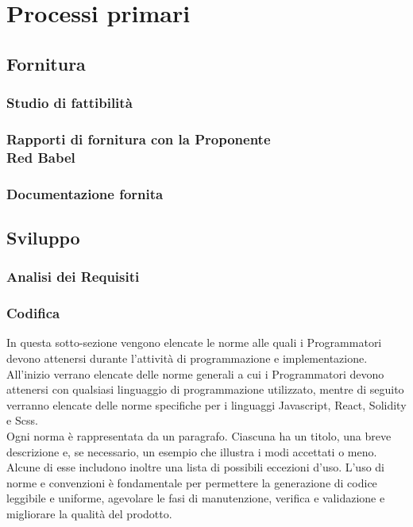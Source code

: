 \documentclass[NormeDiProgetto.tex]{subfiles}
\begin{document}
\chapter{Processi primari}

\section{Fornitura}
\subsection{Studio di fattibilità}
\subsection[Rapporti di fornitura con la Proponente Red Babel]{Rapporti di fornitura con la Proponente \\ Red Babel}
\subsection{Documentazione fornita}

\section{Sviluppo}
\subsection{Analisi dei Requisiti}
\subsection{Codifica}
In questa sotto-sezione vengono elencate le norme alle quali i Programmatori devono attenersi durante l'attività di programmazione e implementazione.\\
All'inizio verrano elencate delle norme generali a cui i Programmatori devono attenersi con qualsiasi linguaggio di programmazione utilizzato, mentre di seguito verranno elencate delle norme specifiche per i linguaggi Javascript, React, Solidity e Scss.\\
Ogni norma è rappresentata da un paragrafo. Ciascuna ha un titolo, una breve descrizione e, se necessario, un esempio che illustra i modi accettati o meno. Alcune di esse includono inoltre una lista di possibili eccezioni d'uso. L'uso di norme e convenzioni è fondamentale per permettere la generazione di codice leggibile e uniforme, agevolare le fasi di manutenzione, verifica e validazione e migliorare la qualità del prodotto.
\end{document}
